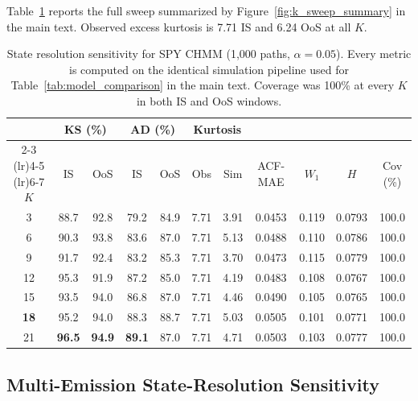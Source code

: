 Table~\ref{tab:sensitivity} reports the full sweep summarized by Figure~\ref{fig:k_sweep_summary} in the main text.
Observed excess kurtosis is 7.71 IS and 6.24 OoS at all $K$.

\begin{table}[H]
\centering
\caption{State resolution sensitivity for SPY CHMM (1{,}000 paths, $\alpha = 0.05$). Every metric is computed on the identical simulation pipeline used for Table~\ref{tab:model_comparison} in the main text. Coverage was 100\% at every $K$ in both IS and OoS windows.}
\label{tab:sensitivity}
\small
\begin{tabular}{c cc cc cc c c c c}
\toprule
& \multicolumn{2}{c}{KS (\%)} & \multicolumn{2}{c}{AD (\%)} & \multicolumn{2}{c}{Kurtosis} & & & & \\
\cmidrule(lr){2-3} \cmidrule(lr){4-5} \cmidrule(lr){6-7}
$K$ & IS & OoS & IS & OoS & Obs & Sim & ACF-MAE & $W_1$ & $H$ & Cov (\%) \\
\midrule
3  & 88.7 & 92.8 & 79.2 & 84.9 & 7.71 & 3.91 & 0.0453 & 0.119 & 0.0793 & 100.0 \\
6  & 90.3 & 93.8 & 83.6 & 87.0 & 7.71 & 5.13 & 0.0488 & 0.110 & 0.0786 & 100.0 \\
9  & 91.7 & 92.4 & 83.2 & 85.3 & 7.71 & 3.70 & 0.0473 & 0.115 & 0.0779 & 100.0 \\
12 & 95.3 & 91.9 & 87.2 & 85.0 & 7.71 & 4.19 & 0.0483 & 0.108 & 0.0767 & 100.0 \\
15 & 93.5 & 94.0 & 86.8 & 87.0 & 7.71 & 4.46 & 0.0490 & 0.105 & 0.0765 & 100.0 \\
\textbf{18} & 95.2 & 94.0 & 88.3 & 88.7 & 7.71 & 5.03 & 0.0505 & 0.101 & 0.0771 & 100.0 \\
21 & \textbf{96.5} & \textbf{94.9} & \textbf{89.1} & 87.0 & 7.71 & 4.71 & 0.0503 & 0.103 & 0.0777 & 100.0 \\
\bottomrule
\end{tabular}
\end{table}

\subsection{Multi-Emission State-Resolution Sensitivity}
\label{sec:multi_emission_sensitivity}

